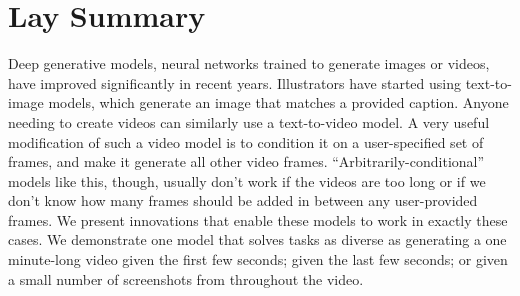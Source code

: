 

\chapter{Lay Summary}

Deep generative models, neural networks trained to generate images or videos, have improved significantly in recent years. Illustrators have started using text-to-image models, which generate an image that matches a provided caption. Anyone needing to create videos can similarly use a text-to-video model. A very useful modification of such a video model is to condition it on a user-specified set of frames, and make it generate all other video frames. ``Arbitrarily-conditional'' models like this, though, usually don't work if the videos are too long or if we don't know how many frames should be added in between any user-provided frames. We present innovations that enable these models to work in exactly these cases. We demonstrate one model that solves tasks as diverse as generating a one minute-long video given the first few seconds; given the last few seconds; or given a small number of screenshots from throughout the video.




\endinput

